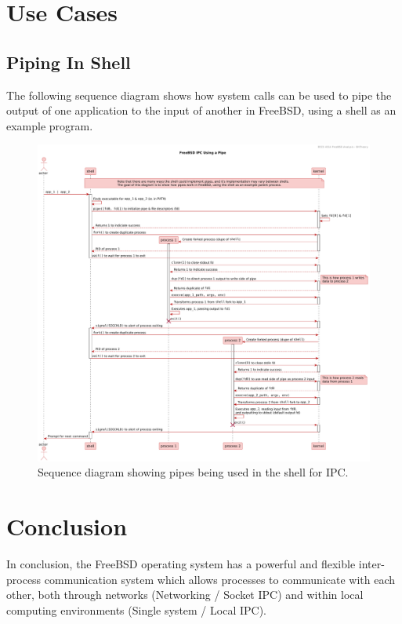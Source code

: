 \documentclass[12pt, dvipsnames, a4paper]{article}
\begin{document}
\section{Use Cases}
\subsection{Piping In Shell}
The following sequence diagram shows how system calls can be used to pipe the
output of one application to the input of another in FreeBSD, using a shell
as an example program.
\begin{figure}[!htb]
	\advance\leftskip-0.5cm
	\includegraphics[width = 570pt]{assets/use_case_diagrams/pipe.pdf}
	\caption{Sequence diagram showing pipes being used in the shell for IPC. \cite{pipe}\cite{fork}\cite{wait}\cite{close}\cite{dup}\cite{execve}\cite{signal}\cite{pipe-explained}}
\end{figure}

\clearpage
\section{Conclusion}
In conclusion, the FreeBSD operating system has a powerful and flexible inter-process communication system which allows processes to communicate with each other, both through networks (Networking / Socket IPC) and within local computing environments (Single system / Local IPC).
\end{document}
